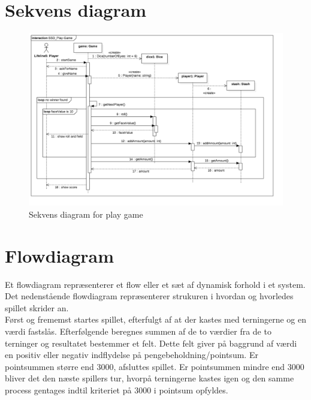 \section{Sekvens diagram}

\begin{figure}[H]
    \begin{center}
        \includegraphics[width=15cm]{graphics/SSD_Play-Game.png}
        \caption{Sekvens diagram for play game}
        \label{fig:sequence_diagram}
    \end{center}
\end{figure}

\newpage

\section{Flowdiagram}

\noindent Et flowdiagram repræsenterer et flow eller et sæt af dynamisk forhold i et system.
Det nedenstående flowdiagram repræsenterer strukuren i hvordan og hvorledes spillet skrider an.\\

\noindent Først og frememst startes spillet, efterfulgt af at der kastes med terningerne og en værdi fastslås.
Efterfølgende beregnes summen af de to værdier fra de to terninger og resultatet bestemmer et felt.
Dette felt giver på baggrund af værdi en positiv eller negativ indflydelse på pengebeholdning/pointsum.
Er pointsummen større end 3000, afsluttes spillet.
Er pointsummen mindre end 3000 bliver det den næste spillers tur, hvorpå terningerne kastes igen og den samme process gentages indtil kriteriet på 3000 i pointsum opfyldes.\\

